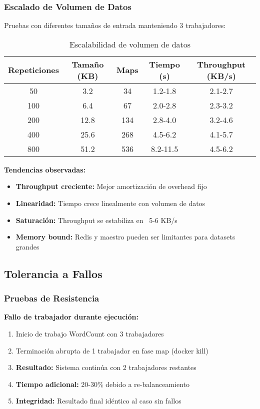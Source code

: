 \subsubsection{Escalado de Volumen de Datos}

Pruebas con diferentes tamaños de entrada manteniendo 3 trabajadores:

\begin{table}[H]
\centering
\begin{tabular}{|c|c|c|c|c|}
\hline
\textbf{Repeticiones} & \textbf{Tamaño (KB)} & \textbf{Maps} & \textbf{Tiempo (s)} & \textbf{Throughput (KB/s)} \\
\hline
50 & 3.2 & 34 & 1.2-1.8 & 2.1-2.7 \\
100 & 6.4 & 67 & 2.0-2.8 & 2.3-3.2 \\
200 & 12.8 & 134 & 2.8-4.0 & 3.2-4.6 \\
400 & 25.6 & 268 & 4.5-6.2 & 4.1-5.7 \\
800 & 51.2 & 536 & 8.2-11.5 & 4.5-6.2 \\
\hline
\end{tabular}
\caption{Escalabilidad de volumen de datos}
\label{table:data_scaling}
\end{table}

\textbf{Tendencias observadas:}
\begin{itemize}
    \item \textbf{Throughput creciente:} Mejor amortización de overhead fijo
    \item \textbf{Linearidad:} Tiempo crece linealmente con volumen de datos
    \item \textbf{Saturación:} Throughput se estabiliza en ~5-6 KB/s
    \item \textbf{Memory bound:} Redis y maestro pueden ser limitantes para datasets grandes
\end{itemize}

\subsection{Tolerancia a Fallos}

\subsubsection{Pruebas de Resistencia}

\textbf{Fallo de trabajador durante ejecución:}
\begin{enumerate}
    \item Inicio de trabajo WordCount con 3 trabajadores
    \item Terminación abrupta de 1 trabajador en fase map (docker kill)
    \item \textbf{Resultado:} Sistema continúa con 2 trabajadores restantes
    \item \textbf{Tiempo adicional:} 20-30\% debido a re-balanceamiento
    \item \textbf{Integridad:} Resultado final idéntico al caso sin fallos
\end{enumerate}

